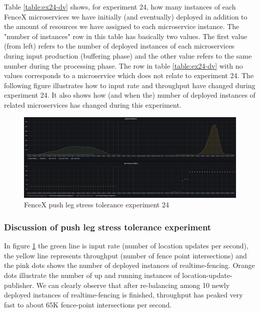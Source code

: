 \documentclass[a4]{report}
\begin{document}
    Table \ref{table:ex24-dv} shows, for experiment 24, how many instances of each FenceX microservices we have
    initially (and eventually) deployed in addition to the amount of resources we have assigned to each microservice
    instance.
    The "number of instances" row in this table has basically two values.
    The first value (from left) refers to the number of deployed instances of each microservices during input production
    (buffering phase) and the other value refers to the same number during the processing phase.
    The row in table \ref{table:ex24-dv} with no values corresponds to a microservice which does not relate to experiment 24.
    The following figure illustrates how to input rate and throughput have changed during experiment 24.
    It also shows how (and when the) number of deployed instances of related microservices has changed during this experiment.

    \begin{figure}
        \centering
        \caption{FenceX push leg stress tolerance experiment 24}
        \label{fig:ex24}
        \includegraphics[width=\textwidth, height=0.35\textheight]{images/evaluation/ex24-benchmarking-ongoing-1per2sec.png}
    \end{figure}

    \clearpage

    \subsubsection{Discussion of push leg stress tolerance experiment}
    In figure \ref{fig:ex24} the green line is input rate (number of location updates per second),
    the yellow line represents throughput (number of fence point intersections) and the pink dots shows the number of
    deployed instances of realtime-fencing.
    Orange dots illustrate the number of up and running instances of location-update-publisher.
    We can clearly observe that after re-balancing among 10 newly deployed instances of realtime-fencing is finished,
    throughput has peaked very fast to about 65K fence-point intersections per second.
\end{document}
